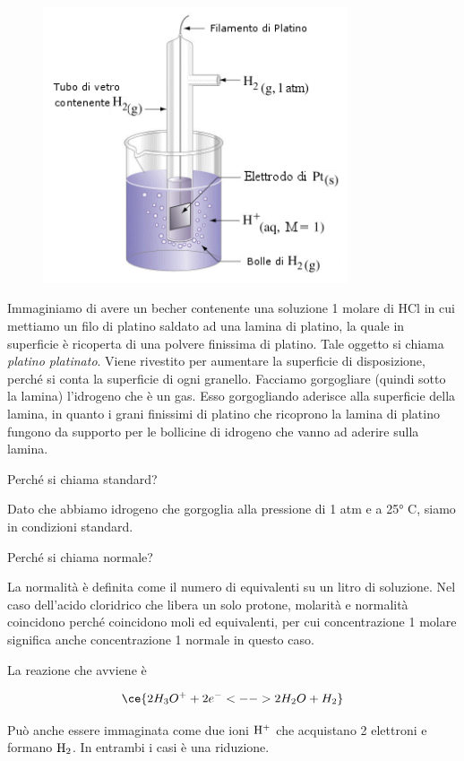 \begin{figure}[H]
    \centering
    \includegraphics[width=9cm]{immagini/Elettrodo_a_idrogeno.png}
\end{figure}

Immaginiamo di avere un becher contenente una soluzione 1 molare di HCl in cui mettiamo un filo di platino saldato ad una lamina di platino, la quale in superficie è ricoperta di una polvere finissima di platino. Tale oggetto si chiama \textit{platino platinato}. Viene rivestito per aumentare la superficie di disposizione, perché si conta la superficie di ogni granello. Facciamo gorgogliare (quindi sotto la lamina) l'idrogeno che è un gas. Esso gorgogliando aderisce alla superficie della lamina, in quanto i grani finissimi di platino che ricoprono la lamina di platino fungono da supporto per le bollicine di idrogeno che vanno ad aderire sulla lamina.

\vspace{0.2cm}Perché si chiama standard?

Dato che abbiamo idrogeno che gorgoglia alla pressione di 1 atm e a 25° C, siamo in condizioni standard.

Perché si chiama normale?

La normalità è definita come il numero di equivalenti su un litro di soluzione. Nel caso dell'acido cloridrico che libera un solo protone, molarità e normalità coincidono perché coincidono moli ed equivalenti, per cui concentrazione 1 molare significa anche concentrazione 1 normale in questo caso.

La reazione che avviene è

$$\ce{2H_3O^+ + 2e^- <--> 2H_2O + H_2}$$

Può anche essere immaginata come due ioni $\rm H^+$ che acquistano 2 elettroni e formano $\rm H_2$. In entrambi i casi è una riduzione.

